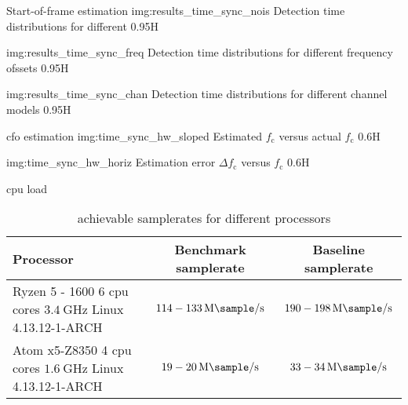 
\begin{subchapter}{Start-of-frame estimation}
               {img:results_time_sync_nois}
               {Detection time distributions for different }
               {0.95}{H}

               {img:results_time_sync_freq}
               {Detection time distributions for different frequency ofssets}
               {0.95}{H}

               {img:results_time_sync_chan}
               {Detection time distributions for different channel models}
               {0.95}{H}
\end{subchapter}

\begin{subchapter}{\Acrlong{cfo} estimation}
                  {img:time_sync_hw_sloped}
                  {Estimated $f_\text{c}$ versus actual $f_\text{c}$}
                  {0.6}{H}

                  {img:time_sync_hw_horiz}
                  {Estimation error $\Delta f_\text{c}$ versus $f_\text{c}$}
                  {0.6}{H}
\end{subchapter}

\begin{subchapter}{\Acrshort{cpu} load}
  \begin{table}[H]
    \centering
    \begin{tabular}{| l | c | c |}
      \hline
      Processor & Benchmark samplerate & Baseline samplerate \\

      \hline
      \parbox[c]{5cm}{\vspace{1mm} Ryzen 5 - 1600 \\ 6 \acrshort{cpu} cores \\ $\SI{3.4}{\giga\hertz}$ \\ Linux 4.13.12-1-ARCH \vspace{1mm}} &
      \parbox[c]{5cm}{\centering $114 - \SI{133}{\mega\sample\per\second}$} &
      \parbox[c]{5cm}{\centering $190 - \SI{198}{\mega\sample\per\second}$} \\

      \hline
      \parbox[c]{5cm}{\vspace{1mm} Atom x5-Z8350 \\ 4 \acrshort{cpu} cores \\ $\SI{1.6}{\giga\hertz}$ \\ Linux 4.13.12-1-ARCH \vspace{1mm}} &
      \parbox[c]{5cm}{\centering $19 - \SI{20}{\mega\sample\per\second}$} &
      \parbox[c]{5cm}{\centering $33 - \SI{34}{\mega\sample\per\second}$} \\

      \hline
    \end{tabular}
    \caption{achievable samplerates for different processors}
    \label{tab:cpuload}
  \end{table}
\end{subchapter}

